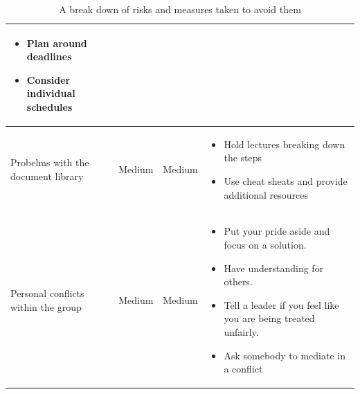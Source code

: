 \documentclass{article}
\begin{document}
\begin{table}[h]
\begin{tabular}{|l|l|l|l|}
{\begin{itemize}
                    \item Plan around deadlines
                    \item Consider individual schedules
                 \end{itemize}}\\
            \hline
            Probelms with the document library & Medium & Medium 
                & \parbox{.45\textwidth}
                {\begin{itemize}
                    \item Hold lectures breaking down the steps
                    \item Use cheat sheats and provide additional resources
                 \end{itemize}}\\
            \hline
            Personal conflicts within the group & Medium & Medium 
                & \parbox{.45\textwidth}
                {\begin{itemize}
                    \item Put your pride aside and focus on a solution.
                    \item Have understanding for others.
                    \item Tell a leader if you feel like you are being treated unfairly.
                    \item Ask somebody to mediate in a conflict
                 \end{itemize}}\\
            \hline
        \end{tabular}
        \caption{A break down of risks and measures taken to avoid them}
    \end{table}
    
\end{document}
